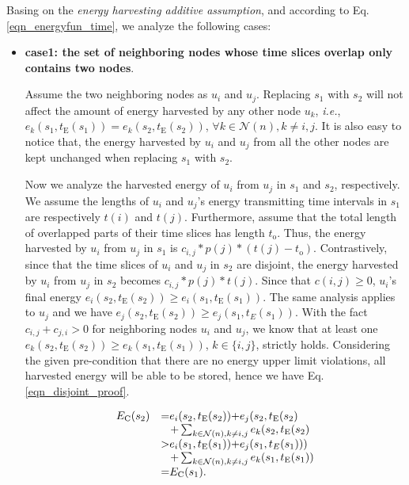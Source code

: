 \documentclass[journal,10pt]{IEEEtran}
\begin{document}
\begin{IEEEproof}
Basing on the \textit{energy harvesting additive assumption}, and according to Eq.\eqref{eqn_energyfun_time}, we analyze the following cases:
\begin{itemize}
\item{\textbf{case1: the set of neighboring nodes whose time slices overlap only contains two nodes}}.

Assume the two neighboring nodes as $u_i$ and $u_j$. Replacing $s_1$ with $s_2$ will not affect the amount of energy harvested by any other node $u_k$, \textit{i.e.}, $e_k(s_1,t_\text{E}(s_1)){=}e_k(s_2,t_\text{E}(s_2))$, ${\forall}k{\in}\mathcal{N}(n), k{\neq}i,j$. It is also easy to notice that, the energy harvested by $u_i$ and $u_j$ from all the other nodes are kept unchanged when replacing $s_1$ with $s_2$.

Now we analyze the harvested energy of $u_i$ from $u_j$ in $s_1$ and $s_2$, respectively. We assume the lengths of $u_i$ and $u_j$'s energy transmitting time intervals in $s_1$ are respectively $t(i)$ and $t(j)$. Furthermore, assume that the total length of overlapped parts of their time slices has length $t_\text{o}$. Thus, the energy harvested by $u_i$ from $u_j$ in $s_1$ is $c_{i,j}{*}p(j){*}(t(j){-}t_\text{o})$. Contrastively, since that the time slices of $u_i$ and $u_j$ in $s_2$ are disjoint, the energy harvested by $u_i$ from $u_j$ in $s_2$ becomes $c_{i,j}{*}p(j){*}t(j)$. Since that $c(i,j){\geq}0$, $u_i$'s final energy $e_i(s_2,t_\text{E}(s_2)){\geq}e_i(s_1,t_\text{E}(s_1))$. The same analysis applies to $u_j$ and we have $e_j(s_2,t_\text{E}(s_2)){\geq}e_j(s_1,t_E(s_1))$. With the fact $c_{i,j}{+}c_{j,i}{>}0$ for neighboring nodes $u_i$ and $u_j$, we know that at least one $e_k(s_2,t_\text{E}(s_2)){\geq}e_k(s_1,t_\text{E}(s_1))$, $k{\in}\{i,j\}$, strictly holds. Considering the given pre-condition that there are no energy upper limit violations, all harvested energy will be able to be stored, hence we have Eq.\eqref{eqn_disjoint_proof}.

\begin{equation}
\label{eqn_disjoint_proof}
\begin{array}{rl}
E_\text{C}(s_2)&{=}e_i(s_2,t_\text{E}(s_2)){+}e_j(s_2,t_\text{E}(s_2)\\
&\hspace{3mm}
{+}\mathop{\sum}_{{k{\in}\mathcal{N}(n),k{\neq}i,j}}e_k(s_2,t_\text{E}(s_2)\\
&{>}e_i(s_1,t_\text{E}(s_1)){+}e_j(s_1,t_E(s_1)))\\
&\hspace{3mm}
{+}\mathop{\sum}_{{k{\in}\mathcal{N}(n),k{\neq}i,j}}e_k(s_1,t_\text{E}(s_1))\\
&{=}E_\text{C}(s_1).
\end{array}
\end{equation}



\end{itemize}
\end{IEEEproof}
\end{document}
